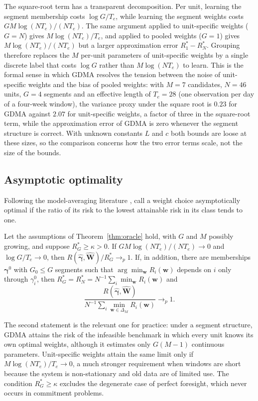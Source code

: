 The square-root term has a transparent decomposition.
Per unit, learning the segment membership costs $\log G/T_e$, while learning the segment weights costs $GM\log(NT_e)/(NT_e)$.
The same argument applied to unit-specific weights ($G=N$) gives $M\log(NT_e)/T_e$, and applied to pooled weights ($G=1$) gives $M\log(NT_e)/(NT_e)$ but a larger approximation error $R^*_1-R^*_N$.
Grouping therefore replaces the $M$ per-unit parameters of unit-specific weights by a single discrete label that costs $\log G$ rather than $M\log(NT_e)$ to learn.
This is the formal sense in which GDMA resolves the tension between the noise of unit-specific weights and the bias of pooled weights: with $M=7$ candidates, $N=46$ units, $G=4$ segments and an effective length of $T_e=28$ (one observation per day of a four-week window), the variance proxy under the square root is $0.23$ for GDMA against $2.07$ for unit-specific weights, a factor of three in the square-root term, while the approximation error of GDMA is zero whenever the segment structure is correct. With unknown constants $L$ and $c$ both bounds are loose at these sizes, so the comparison concerns how the two error terms scale, not the size of the bounds.

\subsection{Asymptotic optimality}

Following the model-averaging literature \citep{Hansen2007,HansenRacine2012,ZhangLiu2023}, call a weight choice asymptotically optimal if the ratio of its risk to the lowest attainable risk in its class tends to one.

\begin{corollary}\label{cor:ao}
Let the assumptions of Theorem~\ref{thm:oracle} hold, with $G$ and $M$ possibly growing, and suppose $R^*_G\ge\kappa>0$.
If $GM\log(NT_e)/(NT_e)\to0$ and $\log G/T_e\to0$, then
$R(\widehat{\bm\gamma},\widehat{\bm W})/R^*_G\to_p1$.
If, in addition, there are memberships $\bm\gamma^0$ with $G_0\le G$ segments such that $\arg\min_{\bm w}R_i(\bm w)$ depends on $i$ only through $\gamma^0_i$, then $R^*_G=R^*_N=N^{-1}\sum_i\min_{\bm w}R_i(\bm w)$ and
\[
\frac{R(\widehat{\bm\gamma},\widehat{\bm W})}{N^{-1}\sum_{i}\min_{\bm w\in\Delta_M}R_i(\bm w)}\to_p1 .
\]
\end{corollary}

The second statement is the relevant one for practice: under a segment structure, GDMA attains the risk of the infeasible benchmark in which every unit knows its own optimal weights, although it estimates only $G(M-1)$ continuous parameters.
Unit-specific weights attain the same limit only if $M\log(NT_e)/T_e\to0$, a much stronger requirement when windows are short because the system is non-stationary and old data are of limited use.
The condition $R^*_G\ge\kappa$ excludes the degenerate case of perfect foresight, which never occurs in commitment problems.

